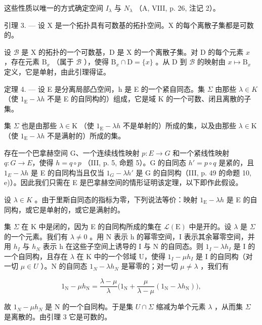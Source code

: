 这些性质以唯一的方式确定空间 \(I_{\lambda}\) 与 \(N_{\lambda}\) （A, VIII, p. 26, 注记 2）。

引理 3. --- 设 X 是一个拓扑具有可数基的拓扑空间。X 的每个离散子集都是可数的。

设 \(\mathcal{B}\) 是 X 的拓扑的一个可数基，D 是 X 的一个离散子集。对 D 的每个元素 \(x\) ，存在元素 \(\mathrm{B}_x\) （属于 \(\mathcal{B}\) ），使得 \(\mathrm{B}_x \cap \mathrm{D} = \{x\}\) 。从 D 到 \(\mathcal{B}\) 的映射由 \(x \mapsto \mathrm{B}_x\) 定义，它是单射，由此引理得证。

定理 4. --- 设 E 是分离局部凸空间，h 是 E 的一个紧自同态。集 \(\Sigma\) 由那些 \(\lambda \in K\) （使 \(1_{\mathrm{E}} - \lambda h\) 不是 E 的自同构的）组成，它是域 K 的一个可数、闭且离散的子集。

集 \(\Sigma\) 也是由那些 \(\lambda\in\mathrm{K}\) （使 \(1_{\mathrm{E}}-\lambda h\) 不是单射的）所成的集，以及由那些 \(\lambda\in\mathrm{K}\) （使 \(1_{\mathrm{E}}-\lambda h\) 不是满射的）所成的集。

存在一个巴拿赫空间 G、一个连续线性映射 \(p: E \rightarrow G\) 和一个紧线性映射 \(q: G \rightarrow E\)，使得 \(h = q \circ p\) （III, p. 5, 命题 5）。G 的自同态 \(h' = p \circ q\) 是紧的，且 \(1_{E} - \lambda h\) 是 E 的自同构当且仅当 \(1_{G} - \lambda h'\) 是 G 的自同构（III, p. 49 的命题 10, e)）。因此我们只需在 E 是巴拿赫空间的情形证明该定理，以下即作此假设。

设 \(\lambda \in K\) 。由于里斯自同态的指标为零，下列说法等价：映射 \(1_{\mathrm{E}} - \lambda h\) 是 E 的自同构，或它是单射的，或它是满射的。

集 \(\Sigma\) 在 K 中是闭的，因为 E 的自同构所成的集在 \(\mathcal{L}(\mathrm{E})\) 中是开的。设 \(\lambda\) 是 \(\Sigma\) 的一个元素。我们有 \(\lambda \neq 0\) 。用 N 表示 h 的幂零空间，I 表示其余幂零空间，并用 \(h_{I}\) 与 \(h_{N}\) 表示 h 在这些子空间上诱导的 I 与 N 的自同态。则 \(1_{I} - \lambda h_{I}\) 是 I 的一个自同构，且存在 \(\lambda\) 在 K 中的一个邻域 U，使得 \(1_{I} - \mu h_{I}\) 是 I 的自同构（对一切 \(\mu \in U\) ）。N 的自同态 \(1_{N} - \lambda h_{N}\) 是幂零的；对一切 \(\mu \neq \lambda\) ，我们有

\[
1 _ {\mathrm{N}} - \mu h _ {\mathrm{N}} = \frac {\lambda - \mu}{\lambda} \Big (1 _ {\mathrm{N}} + \frac {\mu}{\lambda - \mu} (1 _ {\mathrm{N}} - \lambda h _ {\mathrm{N}}) \Big),
\]

故 \(1_{N} - \mu h_{N}\) 是 N 的一个自同构。于是集 \(U \cap \Sigma\) 缩减为单个元素 \(\lambda\) ，从而集 \(\Sigma\) 是离散的。由引理 3 它是可数的。

